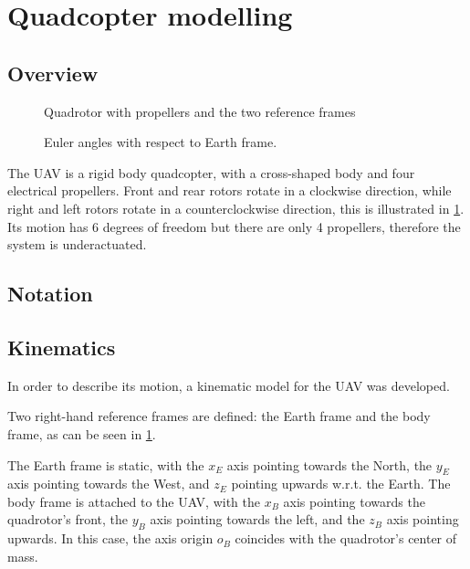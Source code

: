 \documentclass[journal]{IEEEtran}
\begin{document}
	\section{Quadcopter modelling}
	\subsection{Overview}
	\begin{figure}
		\centering
		
		\caption{Quadrotor with propellers and the two reference frames}
		\label{fig:frames_rotors}
	\end{figure}
	
	\begin{figure}
		\centering
		
		\caption{Euler angles with respect to Earth frame.}
		\label{fig:roll_pitch_yaw}
	\end{figure}
	
	The UAV is a rigid body quadcopter, with a cross-shaped body and four electrical propellers. Front and rear rotors rotate in a clockwise direction, while right and left rotors rotate in a counterclockwise direction, this is illustrated in \figurename \ref{fig:frames_rotors}. Its motion has 6 degrees of freedom but there are only 4 propellers, therefore the system is underactuated. 
	
	\subsection{Notation}
	
	\subsection{Kinematics}
	In order to describe its motion, a kinematic model for the UAV was developed.
	
	Two right-hand reference frames are defined: the Earth frame and the body frame, as can be seen in \figurename{\ref{fig:frames_rotors}}. 
	
	The Earth frame is static, with the $x_E$ axis pointing towards the North, the $y_E$ axis pointing towards the West, and $z_E$ pointing upwards w.r.t. the Earth. The body frame is attached to the UAV, with the $x_B$ axis pointing towards the quadrotor's front, the $y_B$ axis pointing towards the left, and the $z_B$ axis pointing upwards. In this case, the axis origin $o_B$ coincides with the quadrotor's center of mass.
	
\end{document}
